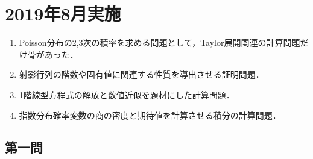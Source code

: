 \documentclass[uplatex,dvipdfmx]{jsarticle}
\begin{document}
\section{2019年8月実施}

\begin{tcolorbox}[colframe=ForestGreen, colback=ForestGreen!10!white,breakable,colbacktitle=ForestGreen!40!white,coltitle=black,fonttitle=\bfseries\sffamily,
    title=概観]
    \begin{enumerate}[{第}1{問}]
        \item Poisson分布の2,3次の積率を求める問題として，Taylor展開関連の計算問題だけ骨があった．
        \item 射影行列の階数や固有値に関連する性質を導出させる証明問題．
        \item 1階線型方程式の解放と数値近似を題材にした計算問題．
        \item 指数分布確率変数の商の密度と期待値を計算させる積分の計算問題．
    \end{enumerate}
\end{tcolorbox}

\subsection{第一問}
\end{document}
